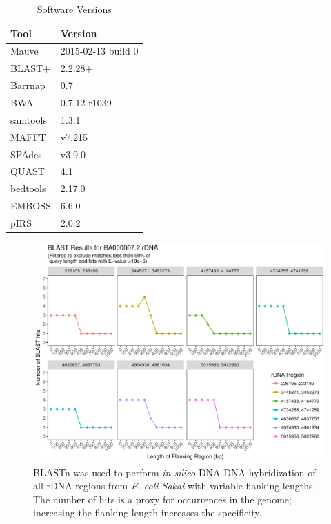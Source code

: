\documentclass[10pt]{article}
\begin{document}
\begin{table}[]
  \centering
  \caption{Software Versions}
  \label{table:software}
  \begin{tabular}{ll}
    \toprule
    Tool & Version \\
    \midrule
    Mauve & 2015-02-13 build 0 \\
    BLAST+ & 2.2.28+ \\
    Barrnap & 0.7 \\
    BWA & 0.7.12-r1039 \\
    samtools & 1.3.1 \\
    MAFFT & v7.215 \\
    SPAdes & v3.9.0 \\
    QUAST & 4.1 \\
    bedtools & 2.17.0 \\
    EMBOSS & 6.6.0 \\
    pIRS & 2.0.2\\
    \bottomrule
  \end{tabular}
\end{table}

\pagebreak

\begin{figure}[!h]
    \centering
    \hspace*{0cm}\includegraphics[width=.8\textwidth]{sakai_BLAST_results}
    \caption{BLASTn was used to perform \textit{in silico} DNA-DNA hybridization of all rDNA regions from \textit{E. coli Sakai} with variable flanking lengths. The number of hits is a proxy for occurrences in the genome; increasing the flanking length increases the specificity.}
    \label{fig:blast}
  \end{figure}
\end{document}
